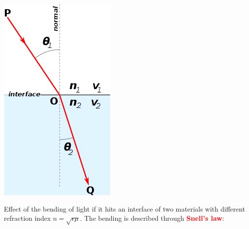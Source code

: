 \documentclass[a4paper, fontsize=8pt, landscape, DIV=1]{scrartcl}
\begin{document}
\begin{multicols*}{4}
\begin{minipage}[t]{0.39\columnwidth}
\begin{flushleft}
				\includegraphics[width=\columnwidth]{images/Introduction/snells_law.png}\\
			\end{flushleft}
		\end{minipage}
		\begin{minipage}[b]{0.59\columnwidth}
			\begin{flushleft}
				Effect of the bending of light if it hits an interface of two materials with different refraction index $n=\sqrt{\epsilon\mu}$. The bending is described through \textbf{\textcolor{red}{Snell's law}}:\\

\end{flushleft}
\end{minipage}
\end{multicols*}
\end{document}
